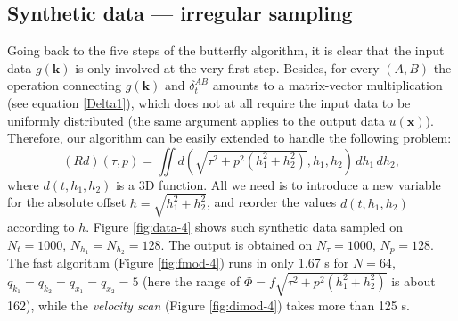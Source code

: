 



\subsection{Synthetic data --- irregular sampling}

Going back to the five steps of the butterfly algorithm, it is clear that the input data $g(\mathbf{k})$ is only involved at the very first step. Besides, for every $(A,B)$ the operation connecting $g(\mathbf{k})$ and $\delta_t^{AB}$ amounts to a matrix-vector multiplication (see equation \ref{Delta1}), which does not at all require the input data to be uniformly distributed (the same argument applies to the output data $u(\mathbf{x})$). Therefore, our algorithm can be easily extended to handle the following problem:
\begin{equation}
(Rd)(\tau,p)=\iint d(\sqrt{\tau^2+p^2(h_1^2+h_2^2)},h_1,h_2)\,dh_1\,dh_2,
\end{equation}
where $d(t,h_1,h_2)$ is a 3D function. All we need is to introduce a new variable for the absolute offset $h=\sqrt{h_1^2+h_2^2}$, and reorder the values $d(t,h_1,h_2)$ according to $h$. Figure \ref{fig:data-4} shows such synthetic data sampled on $N_t=1000$, $N_{h_1}=N_{h_2}=128$. The output is obtained on $N_{\tau}=1000$, $N_p=128$. The fast algorithm (Figure \ref{fig:fmod-4}) runs in only 1.67 s for $N=64$, $q_{k_1}=q_{k_2}=q_{x_1}=q_{x_2}=5$ (here the range of $\Phi=f\sqrt{\tau^2+p^2(h_1^2+h_2^2)}$ is about 162), while the {\it velocity scan} (Figure \ref{fig:dimod-4}) takes more than 125 s.
 

